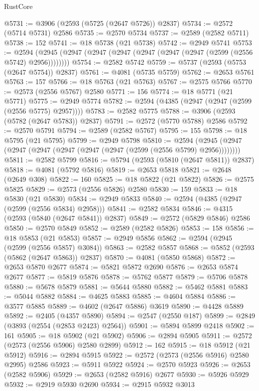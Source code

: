 \begin{lexlean}{RustCore}
\begin{coremodule}
@5731 := @3906 (@2593 (@5725 (@2647 @5726)) @2837)
@5734 := @2572 (@5714 @5731) @2586
@5735 := @2570 @5734
@5737 := @2589 (@2582 @5711)
@5738 := 152
@5741 := @18 @5738 (@21 @5738)
@5742 := @2949 @5741
@5753 := @2594 (@2945 (@2947 (@2947 (@2947 (@2947 (@2947 (@2947 (@2599 (@2556 @5742) @2956))))))))
@5754 := @2582 @5742
@5759 := @5737 (@2593 (@5753 (@2647 @5754)) @2837)
@5761 := @4081 (@5735 @5759)
@5762 := @2653 @5761
@5763 := 157
@5766 := @18 @5763 (@21 @5763)
@5767 := @2575 @5766
@5770 := @2573 (@2556 @5767) @2580
@5771 := 156
@5774 := @18 @5771 (@21 @5771)
@5775 := @2949 @5774
@5782 := @2594 (@4385 (@2947 (@2947 (@2599 (@2556 @5775) @2957))))
@5783 := @2582 @5775
@5788 := @3906 (@2593 (@5782 (@2647 @5783)) @2837)
@5791 := @2572 (@5770 @5788) @2586
@5792 := @2570 @5791
@5794 := @2589 (@2582 @5767)
@5795 := 155
@5798 := @18 @5795 (@21 @5795)
@5799 := @2949 @5798
@5810 := @2594 (@2945 (@2947 (@2947 (@2947 (@2947 (@2947 (@2947 (@2599 (@2556 @5799) @2956))))))))
@5811 := @2582 @5799
@5816 := @5794 (@2593 (@5810 (@2647 @5811)) @2837)
@5818 := @4081 (@5792 @5816)
@5819 := @2653 @5818
@5821 := @2648 (@2649 @308)
@5822 := 160
@5825 := @18 @5822 (@21 @5822)
@5826 := @2575 @5825
@5829 := @2573 (@2556 @5826) @2580
@5830 := 159
@5833 := @18 @5830 (@21 @5830)
@5834 := @2949 @5833
@5840 := @2594 (@4385 (@2947 (@2599 (@2556 @5834) @2958)))
@5841 := @2582 @5834
@5846 := @4315 (@2593 (@5840 (@2647 @5841)) @2837)
@5849 := @2572 (@5829 @5846) @2586
@5850 := @2570 @5849
@5852 := @2589 (@2582 @5826)
@5853 := 158
@5856 := @18 @5853 (@21 @5853)
@5857 := @2949 @5856
@5862 := @2594 (@2945 (@2599 (@2556 @5857) @3084))
@5863 := @2582 @5857
@5868 := @5852 (@2593 (@5862 (@2647 @5863)) @2837)
@5870 := @4081 (@5850 @5868)
@5872 := @2653 @5870 @2677
@5874 := @5821 @5872 @2690
@5876 := @2653 @5874 @2677
@5877 := @5819 @5876
@5878 := @5762 @5877
@5879 := @5706 @5878
@5880 := @5678 @5879
@5881 := @5644 @5880
@5882 := @5462 @5881
@5883 := @5044 @5882
@5884 := @4625 @5883
@5885 := @4604 @5884
@5886 := @3577 @5885
@5889 := @4602 (@2647 @5886) @3619
@5890 := @4428 @5889
@5892 := @2405 (@4357 @5890)
@5894 := @2547 (@2550 @187)
@5899 := @2849 (@3893 (@2554 (@2853 @2423) @2564))
@5901 := @5894 @5899 @2418
@5902 := 161
@5905 := @18 @5902 (@21 @5902)
@5906 := @2894 @5905
@5911 := @2572 (@2573 (@2556 @5906) @2580 @2899)
@5912 := 162
@5915 := @18 @5912 (@21 @5912)
@5916 := @2894 @5915
@5922 := @2572 (@2573 (@2556 @5916) @2580 @2995) @2586
@5923 := @5911 @5922
@5924 := @2570 @5923
@5926 := @2653 (@2582 @5906)
@5929 := @2653 (@2582 @5916) @2677
@5930 := @5926 @5929
@5932 := @2919 @5930 @2690
@5934 := @2915 @5932 @3013

\end{coremodule}
\end{lexlean}
